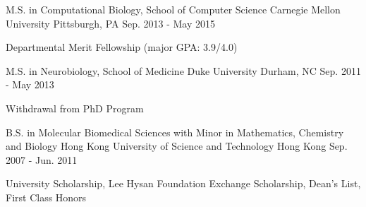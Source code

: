 

\begin{cventries}

  \cventry
    {M.S. in Computational Biology, School of Computer Science} %
    {Carnegie Mellon University} %
    {Pittsburgh, PA} %
    {Sep. 2013 - May 2015} %
    {
      \begin{cvitems} %
          \item {Departmental Merit Fellowship (major GPA: 3.9/4.0)}
      \end{cvitems}
    }
    
  \cventry
    {M.S. in Neurobiology, School of Medicine} %
    {Duke University} %
    {Durham, NC} %
    {Sep. 2011 - May 2013} %
    {
      \begin{cvitems} %
          \item {Withdrawal from PhD Program}
      \end{cvitems}
    }

  \cventry
    {B.S. in Molecular Biomedical Sciences with Minor in Mathematics, Chemistry and Biology} %
    {Hong Kong University of Science and Technology} %
    {Hong Kong} %
    {Sep. 2007 - Jun. 2011} %
    {
      \begin{cvitems} %
          \item {University Scholarship, Lee Hysan Foundation Exchange Scholarship, Dean's List, First Class Honors}
      \end{cvitems}
    }


\end{cventries}
